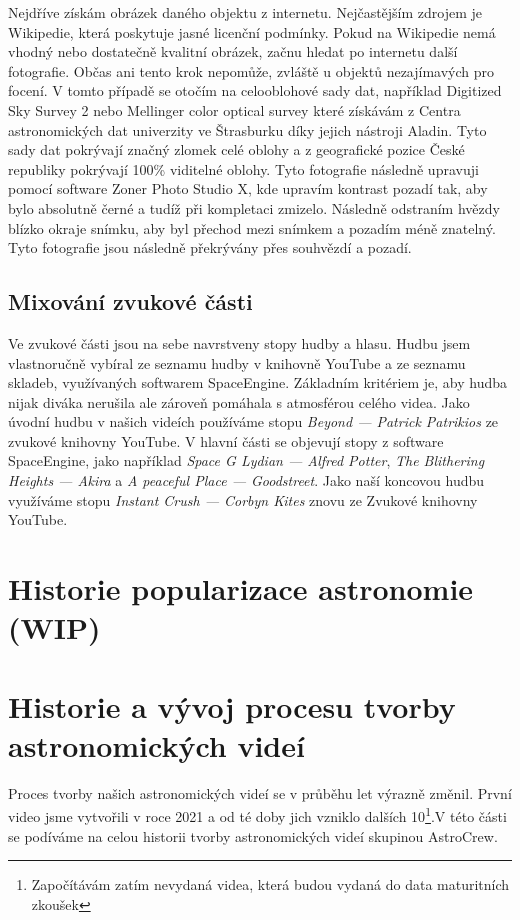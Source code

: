 \documentclass[12pt,a4paper,titlepage]{article}
\begin{document}
Nejdříve získám obrázek daného objektu z internetu. Nejčastějším zdrojem je Wikipedie, která poskytuje jasné licenční podmínky. Pokud na Wikipedie nemá vhodný nebo dostatečně kvalitní obrázek, začnu hledat po internetu další fotografie. Občas ani tento krok nepomůže, zvláště u objektů nezajímavých pro focení. V tomto případě se otočím na celooblohové sady dat, například Digitized Sky Survey 2 nebo Mellinger color optical survey které získávám z Centra astronomických dat univerzity ve Štrasburku díky jejich nástroji Aladin. Tyto sady dat pokrývají značný zlomek celé oblohy a z geografické pozice České republiky pokrývají 100\% viditelné oblohy. Tyto fotografie následně upravuji pomocí software Zoner Photo Studio X, kde upravím kontrast pozadí tak, aby bylo absolutně černé a tudíž při kompletaci zmizelo. Následně odstraním hvězdy blízko okraje snímku, aby byl přechod mezi snímkem a pozadím méně znatelný. Tyto fotografie jsou následně překrývány přes souhvězdí a pozadí. 
\subsection{Mixování zvukové části}
Ve zvukové části jsou na sebe navrstveny stopy hudby a hlasu. Hudbu jsem vlastnoručně vybíral ze seznamu hudby v knihovně YouTube a ze seznamu skladeb, využívaných softwarem SpaceEngine. Základním kritériem je, aby hudba nijak diváka nerušila ale zároveň pomáhala s atmosférou celého videa. Jako úvodní hudbu v našich videích používáme stopu \textit{Beyond --- Patrick Patrikios} ze zvukové knihovny YouTube. V hlavní části se objevují stopy z software SpaceEngine, jako například \textit{Space G Lydian --- Alfred Potter}, \textit{The Blithering Heights --- Akira} a \textit{A peaceful Place --- Goodstreet}. Jako naší koncovou hudbu využíváme stopu \textit{Instant Crush --- Corbyn Kites} znovu ze Zvukové knihovny YouTube.
\section{Historie popularizace astronomie (WIP)}

\section{Historie a vývoj procesu tvorby astronomických videí}
Proces tvorby našich astronomických videí se v průběhu let výrazně změnil. První video jsme vytvořili v roce 2021 a od té doby jich vzniklo dalších 10\footnote{Započítávám zatím nevydaná videa, která budou vydaná do data maturitních zkoušek}.V této části se podíváme na celou historii tvorby astronomických videí skupinou AstroCrew.
\end{document}
